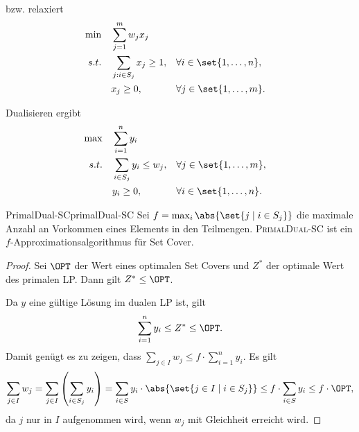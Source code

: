 \documentclass[language=ngerman,algolist]{TemplateLecture}
\begin{document}
bzw. relaxiert
\begin{equation}
    \begin{aligned}
        \min \quad & \sum_{j = 1}^m w_j x_j \\
        s.t. \quad & \sum_{j: i \in S_j} x_j \geq 1, && \forall i \in \set{1,\ldots,n}, \\
                   & x_j \geq 0, && \forall j \in \set{1,\ldots,m}.
    \end{aligned}\label{eq:setCoverPrimal}
\end{equation}

Dualisieren ergibt 
\begin{equation}
    \begin{aligned}
        \max \quad & \sum_{i = 1}^n y_i \\
        s.t. \quad & \sum_{i \in S_j} y_i \leq w_j, && \forall j \in \set{1,\ldots,m}, \\
                   & y_i \geq 0, && \forall i \in \set{1,\ldots,n}.
    \end{aligned}\label{eq:setCoverDual}
\end{equation}

\begin{algorithm}
    \caption{\textsc{PrimalDual-SC}}\label{alg:primalDualSC}
    \begin{algorithmic}[1]
         
        \EndWhile{}
    \end{algorithmic}
\end{algorithm}

\begin{thm}{PrimalDual-SC}{primalDual-SC}
    Sei $f = \max_{i} \abs{\set{j \mid i \in S_j}}$ die maximale Anzahl an Vorkommen eines Elements in den Teilmengen. \textsc{PrimalDual-SC} ist ein $f$-Approximationsalgorithmus für Set Cover.
\end{thm}
\begin{proof}
    Sei $\OPT$ der Wert eines optimalen Set Covers und $Z^*$ der optimale Wert des primalen LP. Dann gilt $Z^* \leq \OPT$.

    Da $y$ eine gültige Lösung im dualen LP ist, gilt 
    \begin{equation*}
        \sum_{i = 1}^n y_i \leq Z^* \leq \OPT.
    \end{equation*}
    Damit genügt es zu zeigen, dass $\sum_{j \in I} w_j \leq f \cdot \sum_{i = 1}^n y_i$. Es gilt
    \begin{equation*}
        \sum_{j \in I} w_j = \sum_{j \in I} \left( \sum_{i \in S_j} y_i \right) = \sum_{i \in S} y_i \cdot \abs{\set{j \in I \mid i \in S_j}} \leq f \cdot \sum_{i \in S} y_i \leq f \cdot \OPT,
    \end{equation*}
    da $j$ nur in $I$ aufgenommen wird, wenn $w_j$ mit Gleichheit erreicht wird.
\end{proof}
\end{document}

